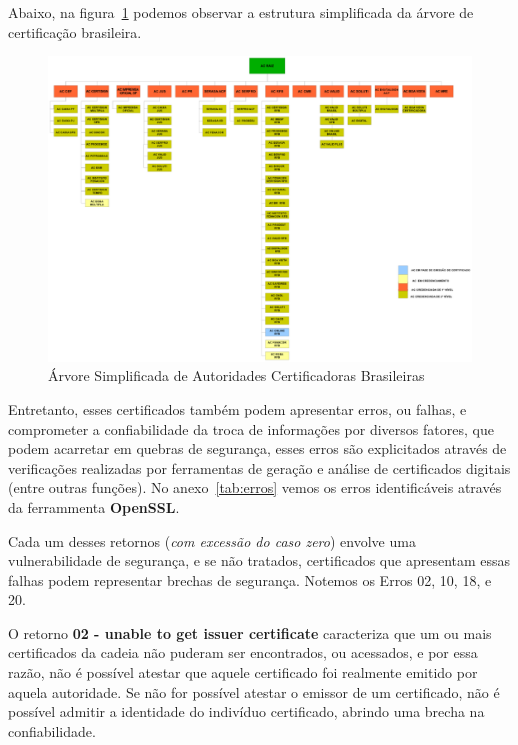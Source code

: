 	Abaixo, na figura~\ref{fig:img08} podemos observar a estrutura simplificada da árvore de certificação brasileira.

	\begin{figure}[!ht]
		\centering
		\includegraphics[keepaspectratio=true,scale=0.7]{figuras/certBR.eps}
		\caption{Árvore Simplificada de Autoridades Certificadoras Brasileiras \cite{itiICPBRASIL}}
		\label{fig:img08}
	\end{figure}

	Entretanto, esses certificados também podem apresentar erros, ou falhas, e comprometer a confiabilidade da troca de informações por diversos fatores, que podem acarretar em quebras de segurança, esses erros são explicitados através de verificações realizadas por ferramentas de geração e análise de certificados digitais (entre outras funções). No anexo~\ref{tab:erros} vemos os erros identificáveis através da ferrammenta \textbf{OpenSSL}. 

	Cada um desses retornos (\textit{com excessão do caso zero}) envolve uma vulnerabilidade de segurança, e se não tratados, certificados que apresentam essas falhas podem representar brechas de segurança. Notemos os Erros 02, 10, 18, e 20.

	O retorno \textbf{02 - unable to get issuer certificate} caracteriza que um ou mais certificados da cadeia não puderam ser encontrados, ou acessados, e por essa razão, não é possível atestar que aquele certificado foi realmente emitido por aquela autoridade. Se não for possível atestar o emissor de um certificado, não é possível admitir a identidade do indivíduo certificado, abrindo uma brecha na confiabilidade.

